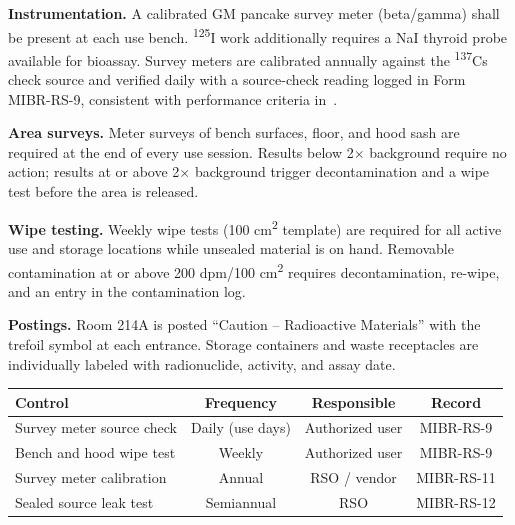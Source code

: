 \begin{minipage}[t]{0.48\linewidth}
\textbf{Instrumentation.} A calibrated GM pancake survey meter (beta/gamma) shall be present at
each use bench. \textsuperscript{125}I work additionally requires a NaI thyroid probe available
for bioassay. Survey meters are calibrated annually against the \textsuperscript{137}Cs check
source and verified daily with a source-check reading logged in Form MIBR-RS-9, consistent with
performance criteria in~\cite{ansi_n13_11}.

\vspace{4pt}
\textbf{Area surveys.} Meter surveys of bench surfaces, floor, and hood sash are required at the
end of every use session. Results below 2$\times$ background require no action; results at or
above 2$\times$ background trigger decontamination and a wipe test before the area is released.
\end{minipage}%
\hfill
\begin{minipage}[t]{0.48\linewidth}
\textbf{Wipe testing.} Weekly wipe tests (100 cm\textsuperscript{2} template) are required for
all active use and storage locations while unsealed material is on hand. Removable contamination
at or above 200 dpm/100 cm\textsuperscript{2} requires decontamination, re-wipe, and an entry in
the contamination log.

\vspace{4pt}
\textbf{Postings.} Room 214A is posted ``Caution -- Radioactive Materials'' with the trefoil
symbol at each entrance. Storage containers and waste receptacles are individually labeled with
radionuclide, activity, and assay date.
\end{minipage}
\par

\vspace{6pt}
\begin{center}
\begin{tabularx}{\linewidth}{@{}X c c c@{}}
\toprule
\textbf{Control} & \textbf{Frequency} & \textbf{Responsible} & \textbf{Record} \\
\midrule
Survey meter source check & Daily (use days) & Authorized user & MIBR-RS-9 \\
Bench and hood wipe test & Weekly & Authorized user & MIBR-RS-9 \\
Survey meter calibration & Annual & RSO / vendor & MIBR-RS-11 \\
Sealed source leak test & Semiannual & RSO & MIBR-RS-12 \\
\bottomrule
\end{tabularx}
\end{center}
